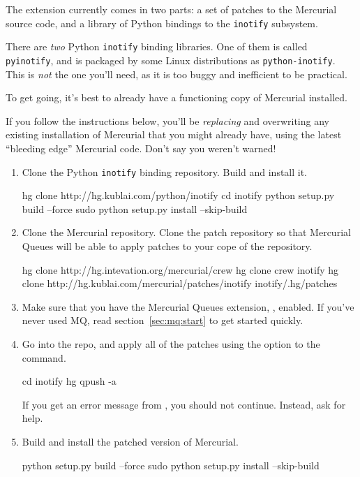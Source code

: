 The extension currently comes in two parts: a set of patches to the
Mercurial source code, and a library of Python bindings to the
\texttt{inotify} subsystem.
\begin{note}
  There are \emph{two} Python \texttt{inotify} binding libraries.  One
  of them is called \texttt{pyinotify}, and is packaged by some Linux
  distributions as \texttt{python-inotify}.  This is \emph{not} the
  one you'll need, as it is too buggy and inefficient to be practical.
\end{note}
To get going, it's best to already have a functioning copy of
Mercurial installed.
\begin{note}
  If you follow the instructions below, you'll be \emph{replacing} and
  overwriting any existing installation of Mercurial that you might
  already have, using the latest ``bleeding edge'' Mercurial code.
  Don't say you weren't warned!
\end{note}
\begin{enumerate}
\item Clone the Python \texttt{inotify} binding repository.  Build and
  install it.
  \begin{codesample4}
    hg clone http://hg.kublai.com/python/inotify
    cd inotify
    python setup.py build --force
    sudo python setup.py install --skip-build
  \end{codesample4}
\item Clone the  Mercurial repository.  Clone the
   patch repository so that Mercurial Queues will be
  able to apply patches to your cope of the  repository.
  \begin{codesample4}
    hg clone http://hg.intevation.org/mercurial/crew
    hg clone crew inotify
    hg clone http://hg.kublai.com/mercurial/patches/inotify inotify/.hg/patches
  \end{codesample4}
\item Make sure that you have the Mercurial Queues extension,
  , enabled.  If you've never used MQ, read
  section~\ref{sec:mq:start} to get started quickly.
\item Go into the  repo, and apply all of the
   patches using the  option to
  the  command.
  \begin{codesample4}
    cd inotify
    hg qpush -a
  \end{codesample4}
  If you get an error message from , you should not
  continue.  Instead, ask for help.
\item Build and install the patched version of Mercurial.
  \begin{codesample4}
    python setup.py build --force
    sudo python setup.py install --skip-build
  \end{codesample4}
\end{enumerate}
